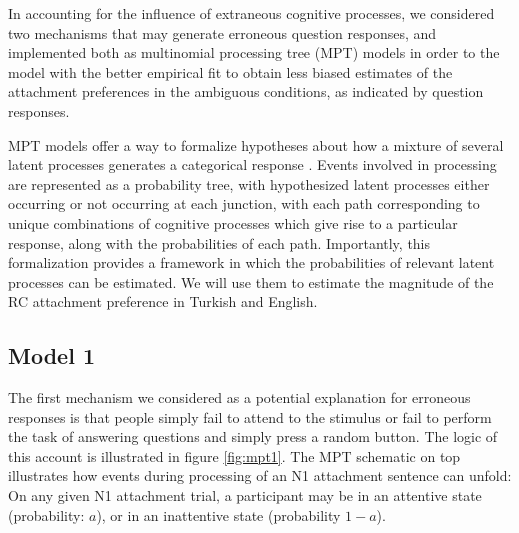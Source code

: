 \documentclass[11pt]{article}\usepackage[]{graphicx}\usepackage[]{color}
\begin{document}
In accounting for the influence of extraneous cognitive processes, we considered two mechanisms that may generate erroneous question responses, and implemented both as multinomial processing tree (MPT) models \citep{BatchelderRiefer:1999} in order to the model with the better empirical fit to obtain less biased estimates of the attachment preferences in the ambiguous conditions, as indicated by question responses. 

MPT models offer a way to formalize hypotheses about how a mixture of several latent processes generates a categorical response 
\citep[cf.][ for an overview]{ErdfelderEtAl:2009}. Events involved in processing are represented as a probability tree, with hypothesized latent processes either occurring or not occurring at each junction, with each path corresponding to unique combinations of cognitive processes which give rise to a particular response, along with the probabilities of each path.
Importantly, this formalization provides a framework in which the probabilities of relevant latent processes can be estimated. We will use them to estimate the magnitude of the RC attachment preference in Turkish and English.






\subsection{Model 1}


The first mechanism we considered as a potential explanation for erroneous responses is that people simply fail to attend to the stimulus or fail to perform the task of answering questions and simply press a random button. The logic of this account is illustrated in figure \ref{fig:mpt1}. The MPT schematic on top illustrates how events during processing of an N1 attachment sentence can unfold: On any given N1 attachment trial, a participant may be in an attentive state (probability: $a$), or in an inattentive state (probability $1-a$).
\end{document}
